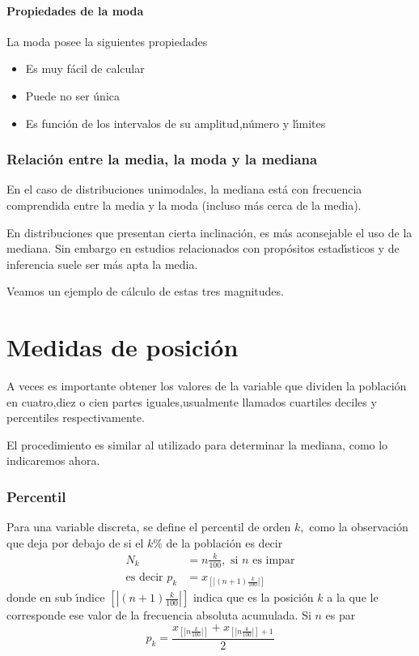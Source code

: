 \paragraph{Propiedades de la moda\newline }

La moda posee la siguientes propiedades

\begin{itemize}
\item Es muy f\'{a}cil de calcular

\item Puede no ser \'{u}nica

\item Es funci\'{o}n de los intervalos de su amplitud,n\'{u}mero y l\'{\i}mites
\end{itemize}

\subsubsection{Relaci\'{o}n entre la media, la moda y la mediana}

En el caso de distribuciones unimodales, la mediana est\'{a} con frecuencia
comprendida entre la media y la moda (incluso m\'{a}s cerca de la media).

En distribuciones que presentan cierta inclinaci\'{o}n, es m\'{a}s aconsejable
el uso de la mediana. Sin embargo en estudios relacionados con prop\'{o}sitos
estad\'{\i}sticos y de inferencia suele ser m\'{a}s apta la media.

Veamos un ejemplo de c\'{a}lculo de estas tres magnitudes.

\section{Medidas de posici\'{o}n}

A veces es importante obtener los valores de la variable que divi\-den la
poblaci\'{o}n en cuatro,diez o cien partes iguales,usualmente llamados
cuartiles deciles y percentiles respectivamente.

El procedimiento es similar al utilizado para determinar la mediana, como lo
indicaremos ahora.

\subsubsection{Percentil}

Para una variable discreta, se define el percentil de orden $k,$ como la
observaci\'{o}n que deja por debajo de si el $k\%$ de la poblaci\'{o}n es
decir
\begin{align*}
N_{k}  &  =n\frac{k}{100},\text{ si }n\text{ es impar}\\
\text{es decir }p_{k}  &  =x_{[|(n+1)\frac{k}{100}|]}%
\end{align*}
donde en sub \'{\i}ndice $[|(n+1)\frac{k}{100}|]$ indica que es la
posici\'{o}n $k$ a la que le corresponde ese valor de la frecuencia absoluta
acumulada. Si $n$ es par
\[
p_{k}=\frac{x_{[|n\frac{k}{100}|]}+x_{[|n\frac{k}{100}|]+1}}{2}%
\]

